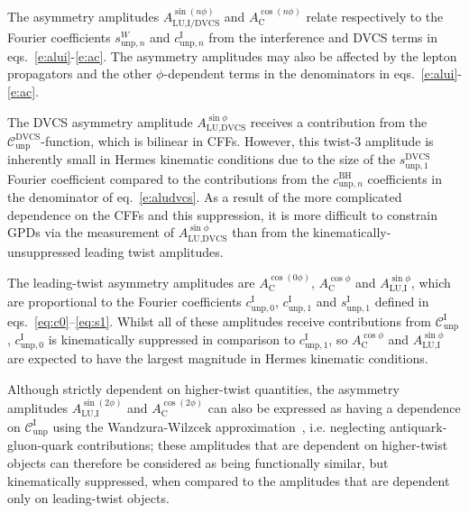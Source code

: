 \documentclass[11pt,a4paper]{article}
\begin{document}
The asymmetry amplitudes $A_{\textrm{LU,I/DVCS}}^{\sin(n\phi)}$ and
$A_{\textrm{C}}^{\cos(n\phi)}$ relate respectively to the Fourier
coefficients $s_{\textrm{unp},n}^{W}$ and $c_{\textrm{unp},n}^{\textrm{I}}$ from the interference and DVCS terms in eqs.~\ref{e:alui}-\ref{e:ac}. The asymmetry amplitudes
may also be affected by the lepton propagators and the other
$\phi$-dependent terms in the denominators in
eqs.~\ref{e:alui}-\ref{e:ac}.

The DVCS asymmetry amplitude $A^{\sin\phi}_{\textrm{LU,DVCS}}$ receives a
contribution from the $\mathcal{C}_{\textrm{unp}}^{\textrm{DVCS}}$-function,
which is bilinear in CFFs. However, this twist-3 amplitude is
inherently small in H{\sc ermes} kinematic conditions due to the size of the $s_{\textrm{unp},1}^{\textrm{DVCS}}$ Fourier coefficient compared to the contributions from the $c_{\textrm{unp},n}^{\textrm{BH}}$ coefficients in the denominator of eq.~\ref{e:aludvcs}. As a result of the more complicated dependence on the CFFs and this suppression, it
is more difficult to constrain GPDs via the measurement of $A^{\sin\phi}_{\textrm{LU,DVCS}}$ than from the kinematically-unsuppressed leading twist amplitudes.

The leading-twist asymmetry amplitudes are $A_{\textrm{C}}^{\cos(0\phi)}$, $A_{\textrm{C}}^{\cos\phi}$ and $A_{\textrm{LU,I}}^{\sin\phi}$, which are proportional to the Fourier coefficients $c_{\textrm{unp},0}^{\textrm{I}}$, $c_{\textrm{unp},1}^{\textrm{I}}$ and $s_{\textrm{unp},1}^{\textrm{I}}$ defined in eqs.~\ref{eq:c0}--\ref{eq:s1}. Whilst all of these amplitudes receive contributions from $\mathcal{C}_{\textrm{unp}}^{\textrm{I}}$, $c_{\textrm{unp},0}^{\textrm{I}}$ is kinematically suppressed in comparison to $c_{\textrm{unp},1}^{\textrm{I}}$, so $A_{\textrm{C}}^{\cos\phi}$ and $A_{\textrm{LU,I}}^{\sin\phi}$ are expected to have the largest magnitude in H{\sc ermes} kinematic conditions.

Although strictly dependent on higher-twist quantities, the asymmetry amplitudes $A_{\textrm{LU},\textrm{I}}^{\sin(2\phi)}$ and $A^{\cos(2\phi)}_{\textrm{C}}$ can also be expressed as having a dependence on $\mathcal{C}_{\textrm{unp}}^{\textrm{I}}$ using the Wandzura-Wilzcek approximation~\cite{Wan}, i.e. neglecting antiquark-gluon-quark contributions; these amplitudes that are dependent on higher-twist objects can therefore be considered as being functionally similar, but kinematically suppressed, when compared to the amplitudes that are dependent only on leading-twist objects.
\end{document}
